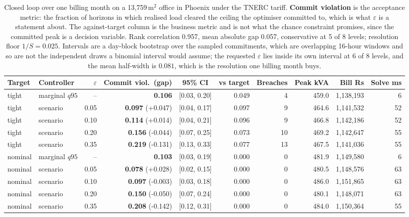 \begin{table}[t]
\centering
\footnotesize
\setlength{\tabcolsep}{3.5pt}
\begin{tabular}{llrrcrrrrr}
\toprule
Target & Controller & $\varepsilon$ & Commit viol.\ (gap) & 95\% CI & vs target & Breaches & Peak kVA & Bill Rs & Solve ms \\
\midrule
tight & marginal $q95$ & -- & \textbf{0.106} & [0.03, 0.20] & 0.049 & 4 & 459.0 & 1,138,193 & 6 \\
tight & scenario & 0.05 & \textbf{0.097} (+0.047) & [0.04, 0.17] & 0.097 & 9 & 464.6 & 1,141,532 & 52 \\
tight & scenario & 0.10 & \textbf{0.114} (+0.014) & [0.04, 0.21] & 0.096 & 9 & 466.8 & 1,142,186 & 52 \\
tight & scenario & 0.20 & \textbf{0.156} (-0.044) & [0.07, 0.25] & 0.073 & 10 & 469.2 & 1,142,647 & 55 \\
tight & scenario & 0.35 & \textbf{0.219} (-0.131) & [0.13, 0.33] & 0.077 & 13 & 467.5 & 1,141,036 & 55 \\
nominal & marginal $q95$ & -- & \textbf{0.103} & [0.03, 0.19] & 0.000 & 0 & 481.9 & 1,149,580 & 6 \\
nominal & scenario & 0.05 & \textbf{0.078} (+0.028) & [0.02, 0.15] & 0.000 & 0 & 480.5 & 1,148,576 & 63 \\
nominal & scenario & 0.10 & \textbf{0.097} (-0.003) & [0.03, 0.18] & 0.000 & 0 & 486.0 & 1,151,865 & 63 \\
nominal & scenario & 0.20 & \textbf{0.150} (-0.050) & [0.07, 0.24] & 0.000 & 0 & 480.1 & 1,148,071 & 63 \\
nominal & scenario & 0.35 & \textbf{0.208} (-0.142) & [0.12, 0.31] & 0.000 & 0 & 484.0 & 1,150,364 & 55 \\
\bottomrule
\end{tabular}
\caption{Closed loop over one billing month on a 13{,}759\,m$^2$ office in Phoenix under the TNERC tariff. \textbf{Commit violation} is the acceptance metric: the fraction of horizons in which realised load cleared the ceiling the optimiser committed to, which is what $\varepsilon$ is a statement about. The against-target column is the business metric and is not what the chance constraint promises, since the committed peak is a decision variable. Rank correlation 0.957, mean absolute gap 0.057, conservative at 5 of 8 levels; resolution floor $1/S=0.025$. Intervals are a day-block bootstrap over the sampled commitments, which are overlapping 16-hour windows and so are not the independent draws a binomial interval would assume; the requested $\varepsilon$ lies inside its own interval at 6 of 8 levels, and the mean half-width is $0.081$, which is the resolution one billing month buys.}
\label{tab:acceptance}
\end{table}
